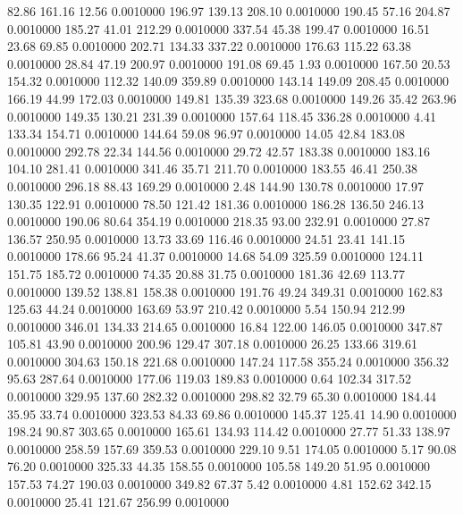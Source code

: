   82.86  161.16   12.56   0.0010000
 196.97  139.13  208.10   0.0010000
 190.45   57.16  204.87   0.0010000
 185.27   41.01  212.29   0.0010000
 337.54   45.38  199.47   0.0010000
  16.51   23.68   69.85   0.0010000
 202.71  134.33  337.22   0.0010000
 176.63  115.22   63.38   0.0010000
  28.84   47.19  200.97   0.0010000
 191.08   69.45    1.93   0.0010000
 167.50   20.53  154.32   0.0010000
 112.32  140.09  359.89   0.0010000
 143.14  149.09  208.45   0.0010000
 166.19   44.99  172.03   0.0010000
 149.81  135.39  323.68   0.0010000
 149.26   35.42  263.96   0.0010000
 149.35  130.21  231.39   0.0010000
 157.64  118.45  336.28   0.0010000
   4.41  133.34  154.71   0.0010000
 144.64   59.08   96.97   0.0010000
  14.05   42.84  183.08   0.0010000
 292.78   22.34  144.56   0.0010000
  29.72   42.57  183.38   0.0010000
 183.16  104.10  281.41   0.0010000
 341.46   35.71  211.70   0.0010000
 183.55   46.41  250.38   0.0010000
 296.18   88.43  169.29   0.0010000
   2.48  144.90  130.78   0.0010000
  17.97  130.35  122.91   0.0010000
  78.50  121.42  181.36   0.0010000
 186.28  136.50  246.13   0.0010000
 190.06   80.64  354.19   0.0010000
 218.35   93.00  232.91   0.0010000
  27.87  136.57  250.95   0.0010000
  13.73   33.69  116.46   0.0010000
  24.51   23.41  141.15   0.0010000
 178.66   95.24   41.37   0.0010000
  14.68   54.09  325.59   0.0010000
 124.11  151.75  185.72   0.0010000
  74.35   20.88   31.75   0.0010000
 181.36   42.69  113.77   0.0010000
 139.52  138.81  158.38   0.0010000
 191.76   49.24  349.31   0.0010000
 162.83  125.63   44.24   0.0010000
 163.69   53.97  210.42   0.0010000
   5.54  150.94  212.99   0.0010000
 346.01  134.33  214.65   0.0010000
  16.84  122.00  146.05   0.0010000
 347.87  105.81   43.90   0.0010000
 200.96  129.47  307.18   0.0010000
  26.25  133.66  319.61   0.0010000
 304.63  150.18  221.68   0.0010000
 147.24  117.58  355.24   0.0010000
 356.32   95.63  287.64   0.0010000
 177.06  119.03  189.83   0.0010000
   0.64  102.34  317.52   0.0010000
 329.95  137.60  282.32   0.0010000
 298.82   32.79   65.30   0.0010000
 184.44   35.95   33.74   0.0010000
 323.53   84.33   69.86   0.0010000
 145.37  125.41   14.90   0.0010000
 198.24   90.87  303.65   0.0010000
 165.61  134.93  114.42   0.0010000
  27.77   51.33  138.97   0.0010000
 258.59  157.69  359.53   0.0010000
 229.10    9.51  174.05   0.0010000
   5.17   90.08   76.20   0.0010000
 325.33   44.35  158.55   0.0010000
 105.58  149.20   51.95   0.0010000
 157.53   74.27  190.03   0.0010000
 349.82   67.37    5.42   0.0010000
   4.81  152.62  342.15   0.0010000
  25.41  121.67  256.99   0.0010000
